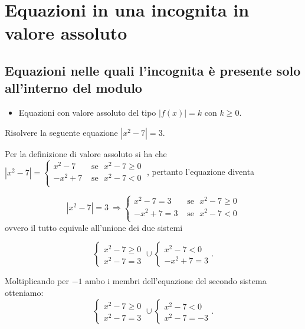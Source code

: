 \section{Equazioni in una incognita in valore assoluto}
\subsection{Equazioni nelle quali l'incognita è presente solo all'interno del modulo}
\begin{itemize}
\item Equazioni con valore assoluto del tipo $\left|f(x)\right|=k\text{ con }k\ge 0$.
\end{itemize}

\begin{exrig}
\begin{esempio}\label{es:7.3}
Risolvere la seguente equazione $\left|x^2-7\right|=3$.

Per la definizione di valore assoluto si ha che
$\left|x^2-7\right|=\begin{cases}
x^2-7 & \text{ se~~}x^2-7 \ge 0\\
-x^2+7 & \text{ se~~}x^2-7 < 0\\
\end{cases}\;$, pertanto l'equazione diventa

\[\left|x^2-7\right|=3 \:\Rightarrow \begin{cases}
x^2-7=3 & \text{ se~~}x^2-7 \ge 0\\
-x^2+7=3 & \text{ se~~}x^2-7 < 0\\
\end{cases}\]
ovvero il tutto equivale all'unione dei due sistemi

\[\left\{\begin{array}{l}{x^2-7\ge 0}\\{x^2-7=3}\end{array}\right.\cup \left\{\begin{array}{l}{x^2-7<0}\\{-x^2+7=3}\end{array}\right..\]

Moltiplicando per $-1$ ambo i membri dell'equazione del secondo sistema otteniamo: \[\left\{\begin{array}{l}{x^2-7\ge 0}\\{x^2-7=3}\end{array}\right.\cup \left\{\begin{array}{l}{x^2-7<0}\\{x^2-7=-3}\end{array}\right..\]


\end{esempio}
\end{exrig}
